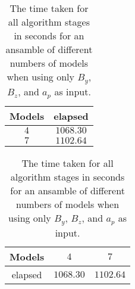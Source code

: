 \begin{table}[!ht]
	\centering
	\begin{tabular}{|c|c|}
		\hline
		Models & elapsed \\ \hline
		$4$ & $1068.30$ \\ \hline
		$7$ & $1102.64$ \\ \hline
	\end{tabular}
	\caption{The time taken for all algorithm stages in seconds for an ansamble of different numbers of models when using only $B_{y}$, $B_{z}$, and $a_{p}$ as input.}
	\label{tab:time:ansamble:yzap}
\end{table}

\begin{table}[!ht]
	\centering
	\begin{tabular}{|c|c|c|}
		\hline
		Models & $4$ & $7$ \\ \hline
		elapsed & $1068.30$ & $1102.64$ \\ \hline
	\end{tabular}
	\caption{The time taken for all algorithm stages in seconds for an ansamble of different numbers of models when using only $B_{y}$, $B_{z}$, and $a_{p}$ as input.}
	\label{tab:time:ansamble:reverse:yzap}
\end{table}
